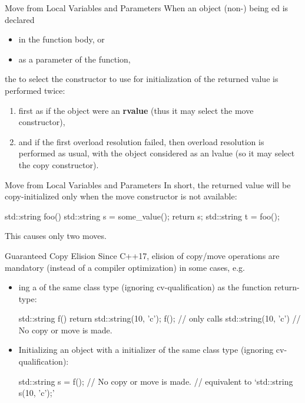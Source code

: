 \begin{frame}{Move from Local Variables and Parameters}
  When an object {\footnotesize(non-)} being ed is declared
  \begin{itemize}
    \item in the function body, or
    \item as a parameter of the function,
  \end{itemize}
  the  to select the constructor to use for initialization of the returned value is performed twice:
  \begin{enumerate}
    \item first as if the object were an \textbf{rvalue} (thus it may select the move constructor),
    \item and if the first overload resolution failed, then overload resolution is performed as usual, with the object considered as an lvalue (so it may select the copy constructor).
  \end{enumerate}
\end{frame}

\begin{frame}[fragile]{Move from Local Variables and Parameters}
  In short, the returned value will be copy-initialized only when the move constructor is not available:
  \begin{cpp}
std::string foo() {
  std::string s = some_value();
  return s;
}
std::string t = foo();
  \end{cpp}
  This causes only two moves.
\end{frame}

\begin{frame}[fragile]{Guaranteed Copy Elision}
  Since C++17, elision of copy/move operations are mandatory (instead of a compiler optimization) in some cases, e.g.
  \begin{itemize}
    \item {}ing a  of the same class type (ignoring cv-qualification) as the function return-type:
    \begin{cpp}
std::string f() {
  return std::string(10, 'c');
}
f(); // only calls std::string(10, 'c')
     // No copy or move is made.
    \end{cpp}
    \item Initializing an object with a  initializer of the same class type (ignoring cv-qualification):
    \begin{cpp}
std::string s = f(); // No copy or move is made.
// equivalent to `std::string s(10, 'c');'
    \end{cpp}
  \end{itemize}
\end{frame}

